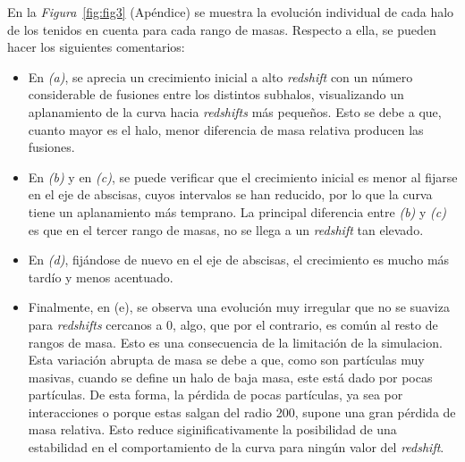 \begin{comment}
La \textit{Figura}~\ref{fig:fig1} representa la evolución de los halos para cada rango de la \textit{Tabla}~\ref{tab:tabla2}. En general, se observan intervalos de crecimiento negativo, lo cuál no tiene una explicación física congruente. Estos decrecimientos son una consecuencia de las limitaciones del modelo y se explican entendiendo que, para un \textit{SnapNum} determinado, halos más pequeños salen fuera del radio 200 del halo principal (radio en que la sobredensidad es 200 veces la crítica de la simulación), dejando de ser considerados, sustrayendo así la masa correspondiente. Posteriormente, este decrecimiento se recupera gracias al colapso gravitacional. Los halos que habían salido vuelven a incluirse en el espacio que abarca el radio del virial del halo principal. \\
\end{comment}

En la \textit{Figura}~\ref{fig:fig3} (Apéndice) se muestra la evolución individual de cada halo de los tenidos en cuenta para cada rango de masas. Respecto a ella, se pueden hacer los siguientes comentarios:
\begin{itemize}
\item En \textit{(a)}, se aprecia un crecimiento inicial a alto \textit{redshift} con un número considerable de fusiones entre los distintos subhalos, visualizando un aplanamiento de la curva hacia \textit{redshifts} más pequeños. Esto se debe a que, cuanto mayor es el halo, menor diferencia de masa relativa producen las fusiones. 
\item En \textit{(b)} y en \textit{(c)}, se puede verificar que el crecimiento inicial es menor al fijarse en el eje de abscisas, cuyos intervalos se han reducido, por lo que la curva tiene un aplanamiento más temprano. La principal diferencia entre \textit{(b)} y \textit{(c)} es que en el tercer rango de masas, no se llega a un \textit{redshift} tan elevado. 
\item En \textit{(d)}, fijándose de nuevo en el eje de abscisas, el crecimiento es mucho más tardío y menos acentuado. 
\item Finalmente, en (e), se observa una evolución muy irregular que no se suaviza para \textit{redshifts} cercanos a 0, algo, que por el contrario, es común al resto de rangos de masa. Esto es una consecuencia de la limitación de la simulacion. Esta variación abrupta de masa se debe a que, como son partículas muy masivas, cuando se define un halo de baja masa, este está dado por pocas partículas. De esta forma, la pérdida de pocas partículas, ya sea por interacciones o porque estas salgan del radio 200, supone una gran pérdida de masa relativa. Esto reduce siginificativamente la posibilidad de una estabilidad en el comportamiento de la curva para ningún valor del \textit{redshift}.
\end{itemize}
\\

